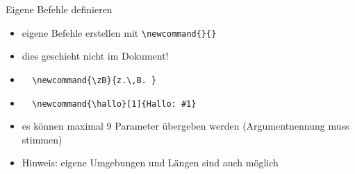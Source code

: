 \begin{frame}[fragile]{Eigene Befehle definieren}
    \begin{itemize}
        \item eigene Befehle erstellen mit \lstinline|\newcommand{}{}|
        \item dies geschieht nicht im Dokument!
        \item \lstinline|  \newcommand{\zB}{z.\,B. }|
        \item \lstinline|  \newcommand{\hallo}[1]{Hallo: #1}|
        \item es können maximal 9 Parameter übergeben werden (Argumentnennung muss stimmen)
        \item Hinweis: eigene Umgebungen und Längen sind auch möglich
    \end{itemize}
\end{frame}
